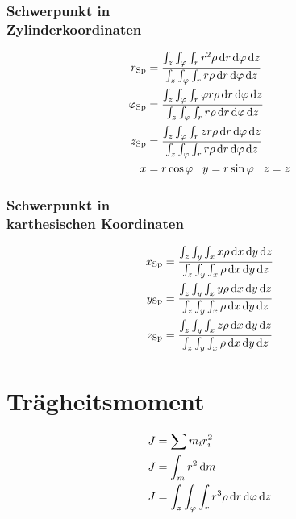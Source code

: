 \begin{multicols}{2}{}
\subsubsection{Schwerpunkt in \\Zylinderkoordinaten}
\begin{align*}
r_{\text{Sp}}&=\frac{\int_z\int_\varphi\int_r r^2\rho \diff r \diff \varphi \diff z }{\int_z\int_\varphi\int_r r\rho \diff r \diff \varphi \diff z }\\
\varphi_{\text{Sp}}&=\frac{\int_z\int_\varphi\int_r \varphi r\rho \diff r \diff \varphi \diff z }{\int_z\int_\varphi\int_r r\rho \diff r \diff \varphi \diff z }\\
z_{\text{Sp}}&=\frac{\int_z\int_\varphi\int_r z r\rho \diff r \diff \varphi \diff z }{\int_z\int_\varphi\int_r r\rho \diff r \diff \varphi \diff z }\\
x&=r\cos{\varphi}\hspace{3mm}y=r\sin{\varphi}\hspace{3mm}z=z
\end{align*}

\subsubsection{Schwerpunkt in \\karthesischen Koordinaten}
\begin{align*}
x_{\text{Sp}}&=\frac{\int_z\int_y\int_x x\rho \diff x \diff y \diff z }{\int_z\int_y\int_x \rho \diff x \diff y \diff z }\\
y_{\text{Sp}}&=\frac{\int_z\int_y\int_x y\rho \diff x \diff y \diff z }{\int_z\int_y\int_x \rho \diff x \diff y \diff z }\\
z_{\text{Sp}}&=\frac{\int_z\int_y\int_x z\rho \diff x \diff y \diff z }{\int_z\int_y\int_x \rho \diff x \diff y \diff z }
\end{align*}
\hfill
\end{multicols}


\newpage
\section{Trägheitsmoment}


\begin{align*}
J&=\sum m_i r_i^2\\
J&=\int_m r^2 \mathop{}\!\mathrm{d} m \\
J&=\int_z\int_\varphi\int_r r^3\rho \mathop{}\!\mathrm{d} r \mathop{}\!\mathrm{d} \varphi \mathop{}\!\mathrm{d} z 
\end{align*}

